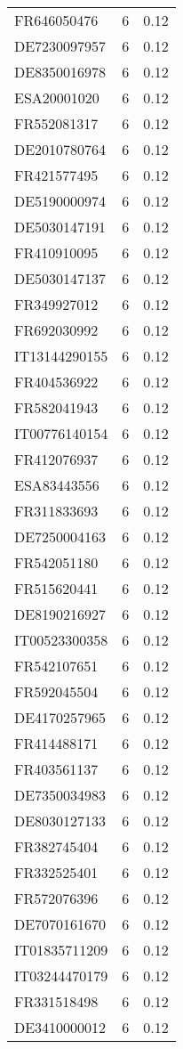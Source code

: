 \begin{table*}[htbp]
\begin{tabular}{lrr}
FR646050476 & 6 & 0.12 \\
DE7230097957 & 6 & 0.12 \\
DE8350016978 & 6 & 0.12 \\
ESA20001020 & 6 & 0.12 \\
FR552081317 & 6 & 0.12 \\
DE2010780764 & 6 & 0.12 \\
FR421577495 & 6 & 0.12 \\
DE5190000974 & 6 & 0.12 \\
DE5030147191 & 6 & 0.12 \\
FR410910095 & 6 & 0.12 \\
DE5030147137 & 6 & 0.12 \\
FR349927012 & 6 & 0.12 \\
FR692030992 & 6 & 0.12 \\
IT13144290155 & 6 & 0.12 \\
FR404536922 & 6 & 0.12 \\
FR582041943 & 6 & 0.12 \\
IT00776140154 & 6 & 0.12 \\
FR412076937 & 6 & 0.12 \\
ESA83443556 & 6 & 0.12 \\
FR311833693 & 6 & 0.12 \\
DE7250004163 & 6 & 0.12 \\
FR542051180 & 6 & 0.12 \\
FR515620441 & 6 & 0.12 \\
DE8190216927 & 6 & 0.12 \\
IT00523300358 & 6 & 0.12 \\
FR542107651 & 6 & 0.12 \\
FR592045504 & 6 & 0.12 \\
DE4170257965 & 6 & 0.12 \\
FR414488171 & 6 & 0.12 \\
FR403561137 & 6 & 0.12 \\
DE7350034983 & 6 & 0.12 \\
DE8030127133 & 6 & 0.12 \\
FR382745404 & 6 & 0.12 \\
FR332525401 & 6 & 0.12 \\
FR572076396 & 6 & 0.12 \\
DE7070161670 & 6 & 0.12 \\
IT01835711209 & 6 & 0.12 \\
IT03244470179 & 6 & 0.12 \\
FR331518498 & 6 & 0.12 \\
DE3410000012 & 6 & 0.12 \\

\end{tabular}
\end{table*}
